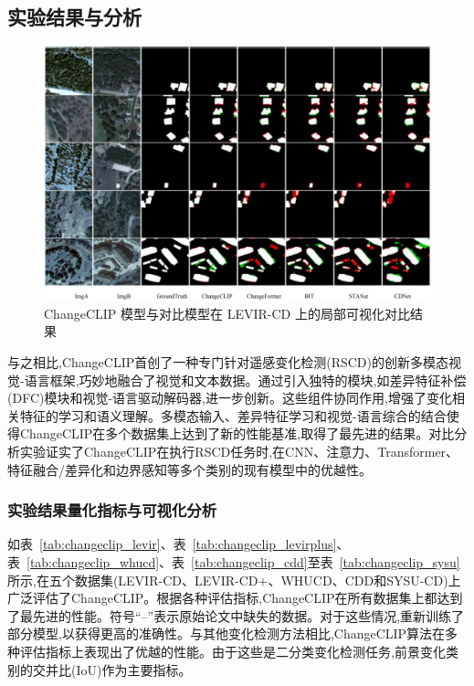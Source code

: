 \subsection{实验结果与分析}

\begin{figure}[!htbp]
  \centering
  \includegraphics[width=\textwidth]{paper_figures/基于AI基础模型微调的变化检测模型研究/ChangeCLIP/changeclip_levir.png}
  \caption{ChangeCLIP 模型与对比模型在 LEVIR-CD 上的局部可视化对比结果}
  \label{fig:changeclip_levir}
\end{figure}

与之相比,ChangeCLIP首创了一种专门针对遥感变化检测(RSCD)的创新多模态视觉-语言框架,巧妙地融合了视觉和文本数据。通过引入独特的模块,如差异特征补偿(DFC)模块和视觉-语言驱动解码器,进一步创新。这些组件协同作用,增强了变化相关特征的学习和语义理解。多模态输入、差异特征学习和视觉-语言综合的结合使得ChangeCLIP在多个数据集上达到了新的性能基准,取得了最先进的结果。对比分析实验证实了ChangeCLIP在执行RSCD任务时,在CNN、注意力、Transformer、特征融合/差异化和边界感知等多个类别的现有模型中的优越性。

\subsubsection{实验结果量化指标与可视化分析}

如表~\ref{tab:changeclip_levir}、表~\ref{tab:changeclip_levirplus}、表~\ref{tab:changeclip_whucd}、表~\ref{tab:changeclip_cdd}至表~\ref{tab:changeclip_sysu}所示,在五个数据集(LEVIR-CD、LEVIR-CD+、WHUCD、CDD和SYSU-CD)上广泛评估了ChangeCLIP。根据各种评估指标,ChangeCLIP在所有数据集上都达到了最先进的性能。符号``--''表示原始论文中缺失的数据。对于这些情况,重新训练了部分模型,以获得更高的准确性。与其他变化检测方法相比,ChangeCLIP算法在多种评估指标上表现出了优越的性能。由于这些是二分类变化检测任务,前景变化类别的交并比(IoU)作为主要指标。

